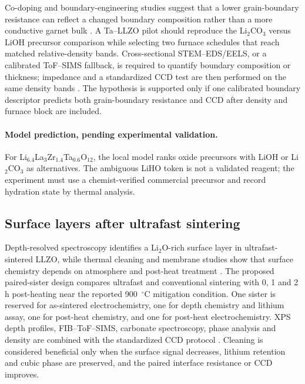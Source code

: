 Co-doping and boundary-engineering studies suggest that a lower grain-boundary resistance can reflect a changed boundary composition rather than a more conductive garnet bulk \cite{ahmad2025reducing,golmohammad2024effects,du2024constructing,yao2026elimination}. A Ta--LLZO pilot should reproduce the Li$_2$CO$_3$ versus LiOH precursor comparison while selecting two furnace schedules that reach matched relative-density bands. Cross-sectional STEM--EDS/EELS, or a calibrated ToF--SIMS fallback, is required to quantify boundary composition or thickness; impedance and a standardized CCD test are then performed on the same density bands \cite{bae2026effect,klimpel2023standardizing}. The hypothesis is supported only if one calibrated boundary descriptor predicts both grain-boundary resistance and CCD after density and furnace block are included.

\paragraph{Model prediction, pending experimental validation.}
For Li$_{6.4}$La$_3$Zr$_{1.4}$Ta$_{0.6}$O$_{12}$, the local model ranks oxide precursors with LiOH or Li$_2$CO$_3$ as alternatives. The ambiguous LiHO token is not a validated reagent; the experiment must use a chemist-verified commercial precursor and record hydration state by thermal analysis.

\subsection{Surface layers after ultrafast sintering}

Depth-resolved spectroscopy identifies a Li$_2$O-rich surface layer in ultrafast-sintered LLZO, while thermal cleaning and membrane studies show that surface chemistry depends on atmosphere and post-heat treatment \cite{zhang2024unveiling,zhang2023on,zhang2023ultrafast,shi2025li2co3}. The proposed paired-sister design compares ultrafast and conventional sintering with 0, 1 and 2 h post-heating near the reported 900~$^{\circ}$C mitigation condition. One sister is reserved for as-sintered electrochemistry, one for depth chemistry and lithium assay, one for post-heat chemistry, and one for post-heat electrochemistry. XPS depth profiles, FIB--ToF--SIMS, carbonate spectroscopy, phase analysis and density are combined with the standardized CCD protocol \cite{klimpel2023standardizing}. Cleaning is considered beneficial only when the surface signal decreases, lithium retention and cubic phase are preserved, and the paired interface resistance or CCD improves.

